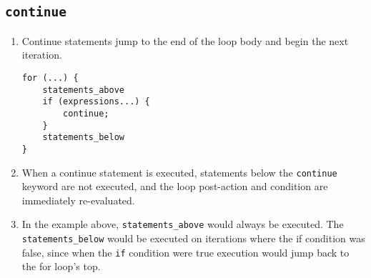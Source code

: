 \subsection{\texorpdfstring{\lstinline|continue|}{continue}}
\begin{enumerate}
	\item Continue statements jump to the end of the loop body and begin the next iteration.
\begin{lstlisting}[numbers=none]
for (...) {
	statements_above
	if (expressions...) {
		continue;
	}
	statements_below
}
\end{lstlisting}
	\item When a continue statement is executed, statements below the \lstinline|continue| keyword are not executed, and the loop post-action and condition are immediately re-evaluated.
	\item In the example above, \lstinline|statements_above| would always be executed. The \lstinline|statements_below| would be executed on iterations where the if condition was false, since when the \lstinline|if| condition were true execution would jump back to the for loop's top.
\end{enumerate}
